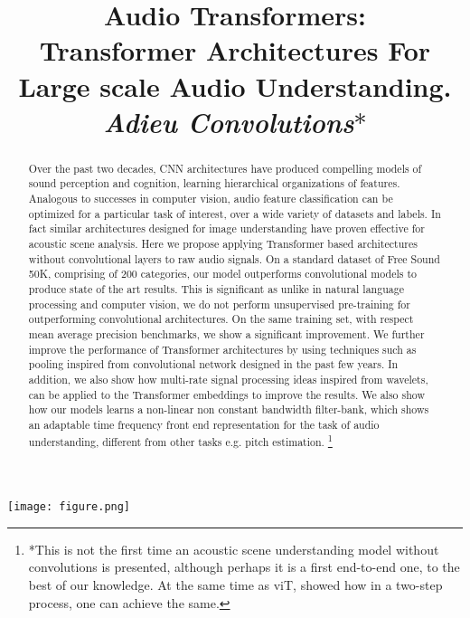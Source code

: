 \documentclass{article}
\title{Audio Transformers:
\\ Transformer Architectures For Large scale Audio Understanding. \\
\textit{Adieu Convolutions$*$}}
\begin{document}
\ninept

\maketitle
\begin{sloppy}
\begin{strip}\centering
\texttt{[image: figure.png]}
\end{strip}

\begin{abstract}
Over the past two decades, CNN architectures have produced compelling models of sound perception and cognition, learning hierarchical organizations of features. Analogous to successes in computer vision, audio feature classification can be optimized for a particular task of interest, over a wide variety of datasets and labels. In fact similar architectures designed for image understanding have proven effective for acoustic scene analysis. Here we propose applying Transformer based architectures without convolutional layers to raw audio signals. On a standard dataset of Free Sound 50K, comprising of 200 categories, our model outperforms convolutional models to produce state of the art results. This is significant as unlike in natural language processing and computer vision, we do not perform unsupervised pre-training for outperforming convolutional architectures. On the same training set, with respect mean average precision benchmarks, we show a significant improvement. We further improve the performance of Transformer architectures by using techniques such as pooling inspired from convolutional network designed in the past few years. In addition, we also show how multi-rate signal processing ideas inspired from wavelets, can be applied to  the Transformer embeddings to improve the results. We also show how our models learns a non-linear non constant bandwidth filter-bank, which shows an adaptable time frequency front end representation for the task of  audio understanding, different from other tasks e.g. pitch estimation.
\footnote{ *This is not the first time an acoustic scene understanding model without convolutions is presented, although perhaps it is a first end-to-end one, to the best of our knowledge. At the same time as viT, \cite{verma2020framework} showed how in a two-step process, one can achieve the same.}
\end{abstract}



\end{sloppy}
\end{document}
